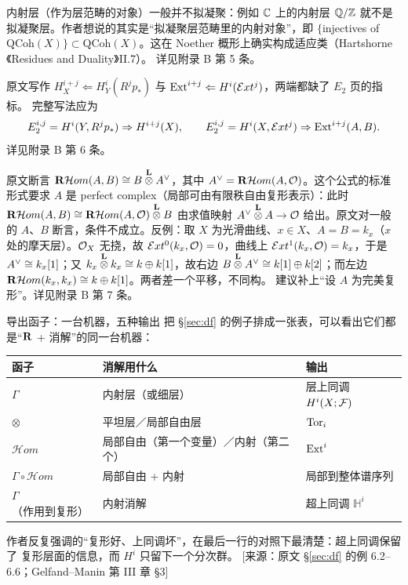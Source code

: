 \begin{kanwu}\label{kanwu:inj}
内射层（作为层范畴的对象）一般并不拟凝聚：例如 $\mathbb{C}$ 上的内射层 $\mathbb Q/\mathbb{Z}$
就不是拟凝聚层。作者想说的其实是“拟凝聚层范畴里的内射对象”，即
$\{$injectives of $\mathrm{QCoh}(X)\}\subset\mathrm{QCoh}(X)$。这在 Noether
概形上确实构成适应类（Hartshorne《Residues and Duality》II.7）。
详见附录 B 第 5 条。
\end{kanwu}

\begin{kanwu}\label{kanwu:ss}
原文写作 $H^{i+j}_X\Leftarrow H^i_Y(R^jp_*)$ 与
$\operatorname{Ext}^{i+j}\Leftarrow H^i(\mathcal Ext^j)$，两端都缺了 $E_2$ 页的指标。
完整写法应为
$$
E_2^{i,j}=H^i(Y,R^jp_*)\Rightarrow H^{i+j}(X),\qquad
E_2^{i,j}=H^i(X,\mathcal Ext^j)\Rightarrow\operatorname{Ext}^{i+j}(A,B).
$$
详见附录 B 第 6 条。
\end{kanwu}

\begin{kanwu}\label{kanwu:perfect}
原文断言 $\R\mathcal Hom(A,B)\cong B\Ltimes A\ve$，其中
$A^{\vee}=\mathbf{R}\mathcal Hom(A,\mathcal{O})$。这个公式的标准形式要求 $A$ 是
{perfect complex}（局部可由有限秩自由复形表示）：此时
$\R\mathcal Hom(A,B)\cong\R\mathcal Hom(A,\OO)\Ltimes B$ 由求值映射
$A\ve\Ltimes A\to\OO$ 给出。原文对一般的 $A$、$B$ 断言，条件不成立。反例：取
$X$ 为光滑曲线、$x\in X$、$A=B=k_x$（$x$ 处的摩天层）。$\mathcal{O}_X$ 无挠，故
$\mathcal{E}xt^0(k_x,\mathcal{O})=0$，曲线上 $\mathcal{E}xt^1(k_x,\mathcal{O})=k_x$，于是
$A^{\vee}\cong k_x[1]$；又 $k_x\Ltimes k_x\cong k\oplus k[1]$，故右边
$B\Ltimes A\ve\cong k[1]\oplus k[2]$；而左边
$\mathbf{R}\mathcal Hom(k_x,k_x)\cong k\oplus k[1]$。两者差一个平移，不同构。
建议补上“设 $A$ 为完美复形”。详见附录 B 第 7 条。
\end{kanwu}

\begin{conceptbox}{导出函子：一台机器，五种输出}
把 §\ref{sec:df} 的例子排成一张表，可以看出它们都是“$\mathbf{R}$ + 消解”的同一台机器：
\begin{center}\small
\begin{tabular}{@{}lll@{}}
\toprule
函子 & 消解用什么 & 输出 \\
\midrule
$\Gamma$ & 内射层（或细层） & 层上同调 $H^i(X;\mathcal{F})$ \\
$\otimes$ & 平坦层／局部自由层 & $\operatorname{Tor}_i$ \\
$\mathcal Hom$ & 局部自由（第一个变量）／内射（第二个） & $\operatorname{Ext}^i$ \\
$\Gamma\circ\mathcal Hom$ & 局部自由 + 内射 & 局部到整体谱序列 \\
$\Gamma$（作用到复形） & 内射消解 & 超上同调 $\mathbb H^i$ \\
\bottomrule
\end{tabular}
\end{center}
作者反复强调的“复形好、上同调坏”，在最后一行的对照下最清楚：超上同调保留了
复形层面的信息，而 $H^i$ 只留下一个分次群。
[来源：原文 §\ref{sec:df} 的例 6.2--6.6；Gelfand--Manin 第 III 章 §3]
\end{conceptbox}

